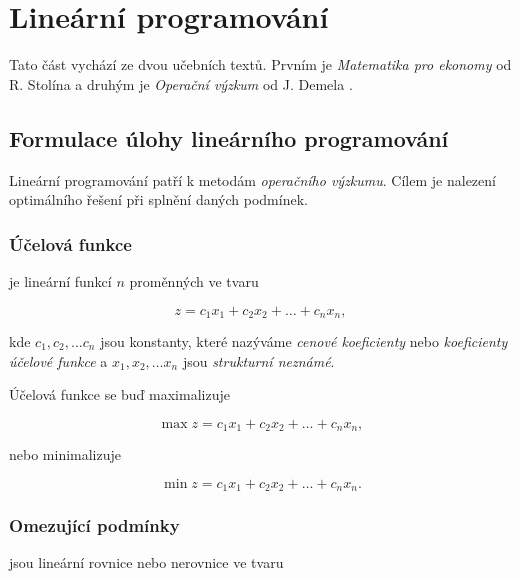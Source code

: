 \section{Lineární programování}
Tato část vychází ze dvou učebních textů. Prvním je \textit{Matematika pro ekonomy} od R. Stolína \cite{matematika_pro_ekonomy} a druhým je \textit{Operační výzkum} od J. Demela \cite{demel}.

\subsection{Formulace úlohy lineárního programování}

Lineární programování patří k metodám \textit{operačního výzkumu}.
Cílem je nalezení optimálního řešení při splnění daných podmínek.

\subsubsection{Účelová funkce}

je lineární funkcí $n$ proměnných ve tvaru

\begin{equation} \label{objective}
    z = c_1x_1 + c_2x_2 + \ldots + c_nx_n ,
\end{equation}


kde $c_1, c_2, \ldots c_n$ jsou konstanty, které nazýváme \textit{cenové koeficienty} nebo \textit{koeficienty účelové funkce} a 
$x_1, x_2, \ldots x_n$ jsou \textit{strukturní neznámé}.

Účelová funkce se buď maximalizuje

\begin{equation} \label{max_objective}
    \max z = c_1x_1 + c_2x_2 + \ldots + c_nx_n ,
\end{equation}

nebo minimalizuje

\begin{equation} \label{min_objective}
    \min z = c_1x_1 + c_2x_2 + \ldots + c_nx_n .
\end{equation}

\subsubsection{Omezující podmínky}

jsou lineární rovnice nebo nerovnice ve tvaru


